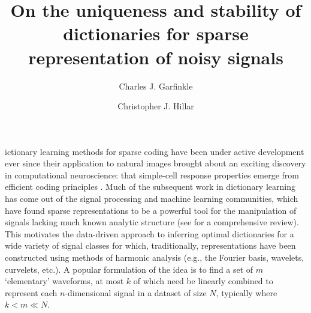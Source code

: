\documentclass[9pt,twocolumn]{pnas-new}
\title{On the uniqueness and stability of dictionaries for sparse representation of noisy signals}
\author[a,1]{Charles J. Garfinkle}
\author[a,1]{Christopher J. Hillar}
\affil[a]{Redwood Center for Theoretical Neuroscience, Berkeley, CA, USA}
\begin{document}
\verticaladjustment{-2pt}

\maketitle
\thispagestyle{firststyle}

ictionary learning methods for sparse coding have been under active development ever since their application to natural images brought about an exciting discovery in computational neuroscience: that simple-cell response properties emerge from efficient coding principles \cite{Olshausen96, hurri1996image, bell1997independent, van1998independent}. Much of the subsequent work in dictionary learning has come out of the signal processing and machine learning communities, which have found sparse representations to be a powerful tool for the manipulation of signals lacking much known analytic structure (see \cite{Zhang15} for a comprehensive review). This motivates the data-driven approach to inferring optimal dictionaries for a wide variety of signal classes for which, traditionally, representations have been constructed using methods of harmonic analysis (e.g., the Fourier basis, wavelets, curvelets, etc.). A popular formulation of the idea is to find a set of $m$ `elementary' waveforms, at most $k$ of which need be linearly combined to represent each $n$-dimensional signal in a dataset of size $N$, typically where $k < m \ll N$. 
\end{document}
